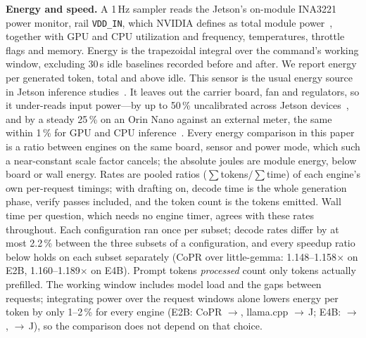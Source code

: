 \documentclass[lettersize,journal]{IEEEtran}
\newcommand{\sys}{CoPR}
\newcommand{\lc}{llama.cpp}
\newcommand{\lgm}{little-gemma}
\begin{document}
\textbf{Energy and speed.} A 1\,Hz sampler reads the Jetson's on-module INA3221
power monitor, rail \texttt{VDD\_IN}, which NVIDIA defines as total module
power~\cite{nvjetsonpower}, together with GPU and CPU utilization and frequency, temperatures,
throttle flags and memory. Energy is the trapezoidal integral over the
command's working window, excluding 30\,s idle baselines recorded before and
after. We report energy per generated token, total and above idle. This sensor is the
usual energy source in Jetson inference studies~\cite{zhan2026,liao2026}. It
leaves out the carrier board, fan and regulators, so it under-reads input
power---by up to 50\,\% uncalibrated across Jetson devices~\cite{shalavi2023},
and by a steady 25\,\% on an Orin Nano against an external meter, the same
within 1\,\% for GPU and CPU inference~\cite{liao2026}. Every energy comparison in
this paper is a ratio between engines on the same board, sensor and power mode,
which such a near-constant scale factor cancels; the absolute joules are module
energy, below board or wall energy. Rates are
pooled ratios ($\sum$tokens$/\sum$time) of each engine's own per-request
timings; with drafting on, decode time is the whole generation phase, verify
passes included, and the token count is the tokens emitted. Wall time per
question, which needs no engine timer, agrees with these rates throughout.
Each configuration ran once per subset; decode rates differ by at most 2.2\,\%
between the three subsets of a configuration, and every speedup ratio below
holds on each subset separately (\sys{} over \lgm{}: 1.148--1.158$\times$ on
E2B, 1.160--1.189$\times$ on E4B).
Prompt tokens \emph{processed} count only tokens actually prefilled.
The working window
includes model load and the gaps between requests; integrating power over the
request windows alone lowers energy per token by only 1--2\,\% for every
engine (E2B: \sys{} \EtwoJA{}$\to$\RwEtwoA{}, \lc{} \EtwoJL{}$\to$\RwEtwoL\,J;
E4B: \EfourJA{}$\to$\RwEfourA{}, \EfourJL{}$\to$\RwEfourL\,J), so the
comparison does not depend on that choice.
\end{document}
